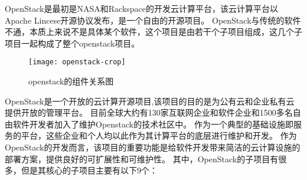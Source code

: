 OpenStack是最初是NASA和Rackspace的开发云计算平台，该云计算平台以Apache Lincese开源协议发布，是一个自由的开源项目。
OpenStack与传统的软件不通，本质上来说不是具体某个软件，这个项目是由若干个子项目组成，这几个子项目一起构成了整个openstack项目。
\begin{figure}[htbp]
\centering\texttt{[image: openstack-crop]}
\caption{openstack的组件关系图}\label{fig:openstack}
\end{figure}
OpenStack是一个开放的云计算开源项目,该项目的目的是为公有云和企业私有云提供开放的管理平台。
目前全球大约有130家互联网企业和软件企业和1500多名自由软件开发者加入了维护Openstack的技术社区中。
作为一个典型的基础设施即服务的平台，这些企业和个人均以此作为其计算平台的底层进行维护和开发。
作为OpenStack的开发而言，该项目的重要功能是给软件开发带来简洁的云计算设施的部署方案，提供良好的可扩展性和可维护性。
其中，OpenStack的子项目有很多，但是其核心的子项目主要有以下9个：

